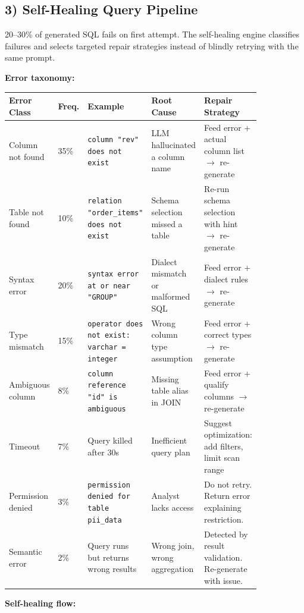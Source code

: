 \subsection*{3) Self-Healing Query Pipeline}

20--30\% of generated SQL fails on first attempt. The self-healing engine classifies failures and selects targeted repair strategies instead of blindly retrying with the same prompt.

\textbf{Error taxonomy:}

\begin{tabular}{|p{0.10\linewidth}|p{0.08\linewidth}|p{0.16\linewidth}|p{0.16\linewidth}|p{0.34\linewidth}|}
\hline
\textbf{Error Class} & \textbf{Freq.} & \textbf{Example} & \textbf{Root Cause} & \textbf{Repair Strategy} \\
\hline
Column not found & 35\% & \texttt{column "rev" does not exist} & LLM hallucinated a column name & Feed error + actual column list $\rightarrow$ re-generate \\
\hline
Table not found & 10\% & \texttt{relation "order\_items" does not exist} & Schema selection missed a table & Re-run schema selection with hint $\rightarrow$ re-generate \\
\hline
Syntax error & 20\% & \texttt{syntax error at or near "GROUP"} & Dialect mismatch or malformed SQL & Feed error + dialect rules $\rightarrow$ re-generate \\
\hline
Type mismatch & 15\% & \texttt{operator does not exist: varchar = integer} & Wrong column type assumption & Feed error + correct types $\rightarrow$ re-generate \\
\hline
Ambiguous column & 8\% & \texttt{column reference "id" is ambiguous} & Missing table alias in JOIN & Feed error + qualify columns $\rightarrow$ re-generate \\
\hline
Timeout & 7\% & Query killed after 30s & Inefficient query plan & Suggest optimization: add filters, limit scan range \\
\hline
Permission denied & 3\% & \texttt{permission denied for table pii\_data} & Analyst lacks access & Do not retry. Return error explaining restriction. \\
\hline
Semantic error & 2\% & Query runs but returns wrong results & Wrong join, wrong aggregation & Detected by result validation. Re-generate with issue. \\
\hline
\end{tabular}

\textbf{Self-healing flow:}

